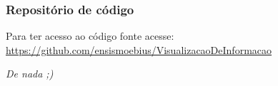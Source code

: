 \begin{frame}
	\frametitle{Repositório de código}
	\par Para ter acesso ao código fonte acesse: \href{https://github.com/ensismoebius/VisualizacaoDeInformacao}{https://github.com/ensismoebius/VisualizacaoDeInformacao}\newline
	\par \textit{De nada ;)}
\end{frame}